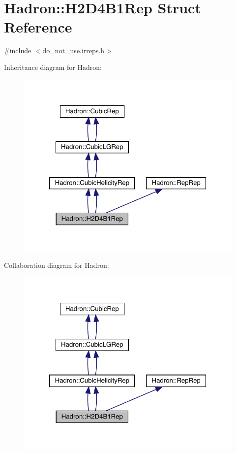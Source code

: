 \hypertarget{structHadron_1_1H2D4B1Rep}{}\section{Hadron\+:\+:H2\+D4\+B1\+Rep Struct Reference}
\label{structHadron_1_1H2D4B1Rep}


{\ttfamily \#include $<$do\+\_\+not\+\_\+use.\+irreps.\+h$>$}



Inheritance diagram for Hadron\+:\nopagebreak
\begin{figure}[H]
\begin{center}
\leavevmode
\includegraphics[width=320pt]{de/dc1/structHadron_1_1H2D4B1Rep__inherit__graph}
\end{center}
\end{figure}


Collaboration diagram for Hadron\+:\nopagebreak
\begin{figure}[H]
\begin{center}
\leavevmode
\includegraphics[width=320pt]{d1/d74/structHadron_1_1H2D4B1Rep__coll__graph}
\end{center}
\end{figure}
